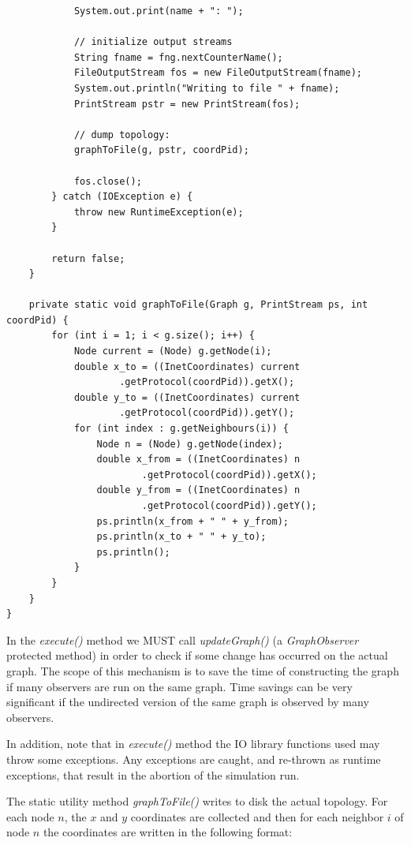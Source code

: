 \documentclass[a4paper,11pt]{article}
\begin{document}
\begin{verbatim}
            System.out.print(name + ": ");

            // initialize output streams
            String fname = fng.nextCounterName();
            FileOutputStream fos = new FileOutputStream(fname);
            System.out.println("Writing to file " + fname);
            PrintStream pstr = new PrintStream(fos);

            // dump topology:
            graphToFile(g, pstr, coordPid);

            fos.close();
        } catch (IOException e) {
            throw new RuntimeException(e);
        }

        return false;
    }

    private static void graphToFile(Graph g, PrintStream ps, int coordPid) {
        for (int i = 1; i < g.size(); i++) {
            Node current = (Node) g.getNode(i);
            double x_to = ((InetCoordinates) current
                    .getProtocol(coordPid)).getX();
            double y_to = ((InetCoordinates) current
                    .getProtocol(coordPid)).getY();
            for (int index : g.getNeighbours(i)) {
                Node n = (Node) g.getNode(index);
                double x_from = ((InetCoordinates) n
                        .getProtocol(coordPid)).getX();
                double y_from = ((InetCoordinates) n
                        .getProtocol(coordPid)).getY();
                ps.println(x_from + " " + y_from);
                ps.println(x_to + " " + y_to);
                ps.println();
            }
        }
    }
}
\end{verbatim}
\normalsize

In the \emph{execute()} method we MUST call \emph{updateGraph()} (a
\emph{GraphObserver} protected method) in order to check if some
change has occurred on the actual graph. 
The scope of this mechanism is to save the time of constructing the
graph if many observers are run on the same graph. Time savings can be very
significant if the undirected version of the same graph is observed by
many observers.

In addition, note that in \emph{execute()} method the IO library functions
used may throw some exceptions. Any
exceptions are caught, and re-thrown as runtime exceptions, that
result in the abortion of the simulation run.

The static utility method \emph{graphToFile()} writes to disk the
actual topology. For each node
$n$, the $x$ and $y$ coordinates are collected and then for each
neighbor $i$ of node $n$ the coordinates are written in the following
format: 
\end{document}
